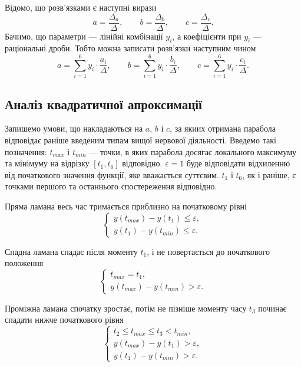 Відомо, що розв’язками є наступні вирази
\begin{equation*}
  a = \frac{\Delta_a}{\Delta},\qquad
  b = \frac{\Delta_b}{\Delta},\qquad
  c = \frac{\Delta_c}{\Delta}.
\end{equation*}
Бачимо, що параметри --- лінійні комбінації $y_i$, а коефіцієнти при $y_i$ ---
раціональні дроби.
Тобто можна записати розв’язки наступним чином
\begin{equation*}
  a = \sum_{i=1}^{6} y_i \cdot \frac{a_i}{\Delta},\qquad
  b = \sum_{i=1}^{6} y_i \cdot \frac{b_i}{\Delta},\qquad
  c = \sum_{i=1}^{6} y_i \cdot \frac{c_i}{\Delta}.
\end{equation*}

\subsection{Аналіз квадратичної апроксимації}

Запишемо умови, що накладаються на $a$, $b$ і $c$, за якиих отримана
парабола відповідає раніше введеним типам вищої нервової діяльності.
Введемо такі позначення: $t_{max}$ і $t_{min}$ --- точки, в яких парабола
досягає локального максимуму та мінімуму на відрізку $\left[ t_1, t_6 \right]$
відповідно.
$\varepsilon = 1$ буде відповідати відхиленню від початкового
значення функції, яке вважається суттєвим.
$t_1$ і $t_6$, як і раніше, є точками першого та останнього спостереження
відповідно.

Пряма ламана весь час тримається приблизно на початковому рівні
\begin{equation*}
  \begin{cases}
    y\left( t_{max} \right) - y\left( t_1 \right) \le \varepsilon, \\
    y\left( t_1 \right) - y\left( t_{min} \right) \le \varepsilon.
  \end{cases}
\end{equation*}

Спадна ламана спадає після моменту $t_1$, і не повертається до початкового
положення
\begin{equation*}
  \begin{cases}
    t_{max} = t_1, \\
    y\left( t_{max} \right) - y\left( t_{min} \right) > \varepsilon.
  \end{cases}
\end{equation*}

Проміжна ламана спочатку зростає, потім не пізніше моменту часу $t_3$ починає
спадати нижче початкового рівня
\begin{equation*}
  \begin{cases}
    t_2 \le t_{max} \le t_3 < t_{min}, \\
    y\left( t_{max} \right) - y\left( t_1\right) > \varepsilon, \\
    y\left( t_1 \right) - y\left( t_{min} \right) > \varepsilon.
  \end{cases}
\end{equation*}

